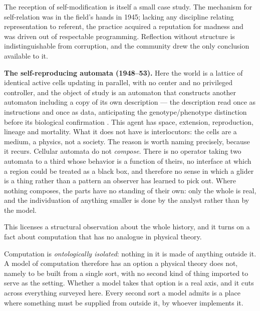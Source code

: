 The reception of self-modification is itself a small case study.
The mechanism for self-relation was in the field's hands in 1945;
lacking any discipline relating representation to referent, the
practice acquired a reputation for madness and was driven out of
respectable programming.
Reflection without structure is indistinguishable from corruption,
and the community drew the only conclusion available to it.

\textbf{The self-reproducing automata (1948--53).}
Here the world is a lattice of identical active cells updating in
parallel, with no center and no privileged controller, and the
object of study is an automaton that constructs another automaton
including a copy of its own description --- the description read
once as instructions and once as data, anticipating the
genotype/phenotype distinction before its biological confirmation
\cite{vonneumann1966}.
This agent has space, extension, reproduction, lineage and
mortality.
What it does not have is interlocutors: the cells are a medium, a
physics, not a society.
The reason is worth naming precisely, because it recurs.
Cellular automata do not \emph{compose}.
There is no operator taking two automata to a third whose behavior
is a function of theirs, no interface at which a region could be
treated as a black box, and therefore no sense in which a glider is
a thing rather than a pattern an observer has learned to pick out.
Where nothing composes, the parts have no standing of their own:
only the whole is real, and the individuation of anything smaller is
done by the analyst rather than by the model.

This licenses a structural observation about the whole history, and
it turns on a fact about computation that has no analogue in
physical theory.

\begin{observation}
\label{psy:obs:isolation}
Computation is \emph{ontologically isolated}: nothing in it is made
of anything outside it.
A model of computation therefore has an option a physical theory
does not, namely to be built from a single sort, with no second
kind of thing imported to serve as the setting.
Whether a model takes that option is a real axis, and it cuts
across everything surveyed here.
Every second sort a model admits is a place where something must be
supplied from outside it, by whoever implements it.
\end{observation}

